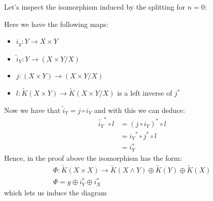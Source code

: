 \begin{corollary}
	Let's inspect the isomorphism induced by the splitting for $n=0$: 
	\begin{center}
	\end{center}
	Here we have the following maps:
	\begin{itemize}
		\item $i_y:Y\to X\times Y$
		\item $\tilde{i}_Y:Y\to (X\times Y\slash X)$
		\item $j:(X\times Y)\to (X\times Y\slash X)$
		\item $l:\tilde{K}(X\times Y) \to \tilde{K}(X\times Y\slash X)$ is a left inverse of $j^*$
	\end{itemize}
	Now we have that $\tilde{i}_Y=j\circ i_Y$ and with this we can deduce:
	\begin{align*}
		\tilde{i_Y}^*\circ l&=(j\circ i_Y)^*\circ l \\
		&={i_Y}^*\circ j^* \circ l\\        
		&= i_Y^*
	\end{align*}
	Hence, in the proof above the isomorphism has the form:
	\begin{align*}
		\Phi: \tilde{K}(X\times X)\to \tilde{K}(X\wedge Y)\oplus \tilde{K}(Y)\oplus \tilde{K}(X) \\ 
		\Phi=g\oplus i_Y^*\oplus i_X^*
	\end{align*} which lets us induce the diagram
	\begin{center}
\end{center}
\end{corollary}
